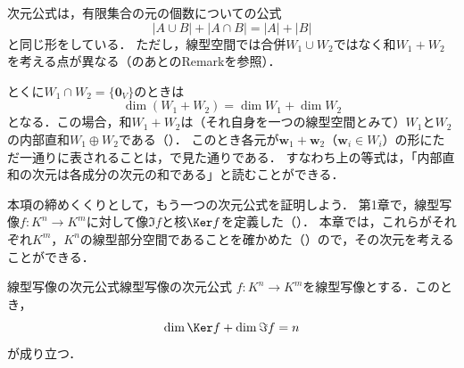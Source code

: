 \begin{remark}[次元公式の読み方]
  次元公式は，有限集合の元の個数についての公式
  \[
    |A \cup B| + |A \cap B| = |A| + |B|
  \]
  と同じ形をしている．
  ただし，線型空間では合併$W_1 \cup W_2$ではなく和$W_1 + W_2$を考える点が異なる（のあとのRemarkを参照）．

  とくに$W_1 \cap W_2 = \{\bm{0}_V\}$のときは
  \[
    \dim(W_1 + W_2) = \dim W_1 + \dim W_2
  \]
  となる．この場合，和$W_1 + W_2$は（それ自身を一つの線型空間とみて）$W_1$と$W_2$の内部直和$W_1 \oplus W_2$である（）．
  このとき各元が$\bm{w}_1 + \bm{w}_2$（$\bm{w}_i \in W_i$）の形にただ一通りに表されることは，で見た通りである．
  すなわち上の等式は，「内部直和の次元は各成分の次元の和である」と読むことができる．
\end{remark}

本項の締めくくりとして，もう一つの次元公式を証明しよう．
第1章で，線型写像$f \colon K^n \to K^m$に対して像$\Im f$と核$\Ker f$を定義した（）．
本章では，これらがそれぞれ$K^m$，$K^n$の線型部分空間であることを確かめた（）ので，その次元を考えることができる．

\begin{theorem}{線型写像の次元公式}{線型写像の次元公式}
  $f \colon K^n \to K^m$を線型写像とする．このとき，
  \[
    \dim \Ker f + \dim \Im f = n
  \]
  が成り立つ．
\end{theorem}

